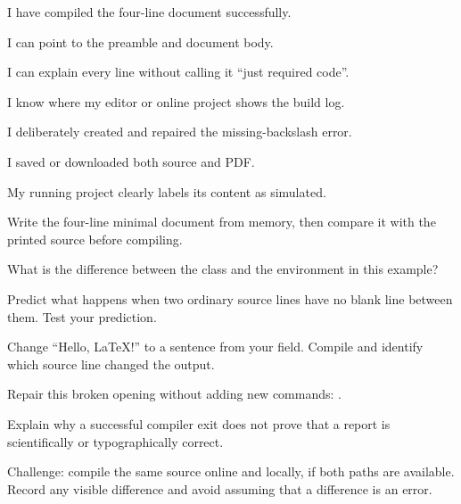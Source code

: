 \chaptercheck

\begin{chapterchecklist}
  \item I have compiled the four-line document successfully.
  \item I can point to the preamble and document body.
  \item I can explain every line without calling it ``just required code''.
  \item I know where my editor or online project shows the build log.
  \item I deliberately created and repaired the missing-backslash error.
  \item I saved or downloaded both source and PDF.
  \item My running project clearly labels its content as simulated.
\end{chapterchecklist}

\chapterexercisestitle

\begin{chapterexercises}
  \item Write the four-line minimal document from memory, then compare it with
        the printed source before compiling.
  \item What is the difference between the  class and the
         environment in this example?
  \item Predict what happens when two ordinary source lines have no blank line
        between them. Test your prediction.
  \item Change ``Hello, \LaTeX{}!'' to a sentence from your field. Compile and
        identify which source line changed the output.
  \item Repair this broken opening without adding new commands:
        .
  \item Explain why a successful compiler exit does not prove that a report is
        scientifically or typographically correct.
  \item Challenge: compile the same source online and locally, if both paths
        are available. Record any visible difference and avoid assuming that a
        difference is an error.
\end{chapterexercises}

